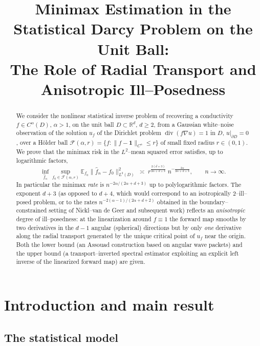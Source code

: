 \documentclass[11pt]{article}
\title{Minimax Estimation in the Statistical Darcy Problem on the Unit Ball:\\
The Role of Radial Transport and Anisotropic Ill--Posedness}
\author{}
\date{}
\newcommand{\R}{\mathbb{R}}
\newcommand{\E}{\mathbb{E}}
\newcommand{\1}{\mathbf{1}}
\newcommand{\norm}[1]{\lVert #1\rVert}
\newcommand{\F}{\mathcal{F}}
\DeclareMathOperator{\divg}{div}
\begin{document}
\maketitle

\begin{abstract}
We consider the nonlinear statistical inverse problem of recovering a conductivity
$f\in C^\alpha(D)$, $\alpha>1$, on the unit ball $D\subset\R^d$, $d\ge 2$, from a Gaussian
white--noise observation of the solution $u_f$ of the Dirichlet problem
$\divg(f\nabla u)=1$ in $D$, $u|_{\partial D}=0$, over a H\"older ball
$\F(\alpha,r)=\{f:\norm{f-\1}_{C^\alpha}\le r\}$ of small fixed radius $r\in(0,1)$.
We prove that the minimax risk in the $L^2$--mean squared error satisfies, up to
logarithmic factors,
\[
\inf_{\hat f_n}\sup_{f_0\in\F(\alpha,r)}\E_{f_0}\norm{\hat f_n-f_0}^2_{L^2(D)}
\;\asymp\;
r^{\frac{2(d+3)}{2\alpha+d+3}}\; n^{-\frac{2\alpha}{2\alpha+d+3}},
\qquad n\to\infty .
\]
In particular the minimax \emph{rate} is $n^{-2\alpha/(2\alpha+d+3)}$ up to
polylogarithmic factors. The exponent $d+3$ (as opposed to $d+4$, which would
correspond to an isotropically $2$--ill--posed problem, or to the rates
$n^{-2(\alpha-1)/(2\alpha+d+2)}$ obtained in the boundary--constrained setting
of Nickl--van de Geer and subsequent work) reflects an \emph{anisotropic} degree of
ill--posedness: at the linearization around $f\equiv 1$ the forward map smooths by two
derivatives in the $d-1$ angular (spherical) directions but by only \emph{one} derivative
along the radial transport generated by the unique critical point of $u_f$ near the origin.
Both the lower bound (an Assouad construction based on angular wave packets) and the
upper bound (a transport--inverted spectral estimator exploiting an explicit left inverse
of the linearized forward map) are given.
\end{abstract}

\tableofcontents

\section{Introduction and main result}\label{sec:intro}

\subsection{The statistical model}
\end{document}
